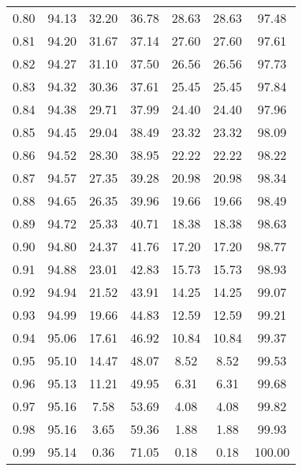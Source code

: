 \begin{tabular}{|c|c|c|c|c|c|c|}
      0.80 &     94.13 &     32.20 &      36.78 &   28.63 &      28.63 &         97.48 \\
      0.81 &     94.20 &     31.67 &      37.14 &   27.60 &      27.60 &         97.61 \\
      0.82 &     94.27 &     31.10 &      37.50 &   26.56 &      26.56 &         97.73 \\
      0.83 &     94.32 &     30.36 &      37.61 &   25.45 &      25.45 &         97.84 \\
      0.84 &     94.38 &     29.71 &      37.99 &   24.40 &      24.40 &         97.96 \\
      0.85 &     94.45 &     29.04 &      38.49 &   23.32 &      23.32 &         98.09 \\
      0.86 &     94.52 &     28.30 &      38.95 &   22.22 &      22.22 &         98.22 \\
      0.87 &     94.57 &     27.35 &      39.28 &   20.98 &      20.98 &         98.34 \\
      0.88 &     94.65 &     26.35 &      39.96 &   19.66 &      19.66 &         98.49 \\
      0.89 &     94.72 &     25.33 &      40.71 &   18.38 &      18.38 &         98.63 \\
      0.90 &     94.80 &     24.37 &      41.76 &   17.20 &      17.20 &         98.77 \\
      0.91 &     94.88 &     23.01 &      42.83 &   15.73 &      15.73 &         98.93 \\
      0.92 &     94.94 &     21.52 &      43.91 &   14.25 &      14.25 &         99.07 \\
      0.93 &     94.99 &     19.66 &      44.83 &   12.59 &      12.59 &         99.21 \\
      0.94 &     95.06 &     17.61 &      46.92 &   10.84 &      10.84 &         99.37 \\
      0.95 &     95.10 &     14.47 &      48.07 &    8.52 &       8.52 &         99.53 \\
      0.96 &     95.13 &     11.21 &      49.95 &    6.31 &       6.31 &         99.68 \\
      0.97 &     95.16 &      7.58 &      53.69 &    4.08 &       4.08 &         99.82 \\
      0.98 &     95.16 &      3.65 &      59.36 &    1.88 &       1.88 &         99.93 \\
      0.99 &     95.14 &      0.36 &      71.05 &    0.18 &       0.18 &        100.00 \\
\bottomrule
\end{tabular}
